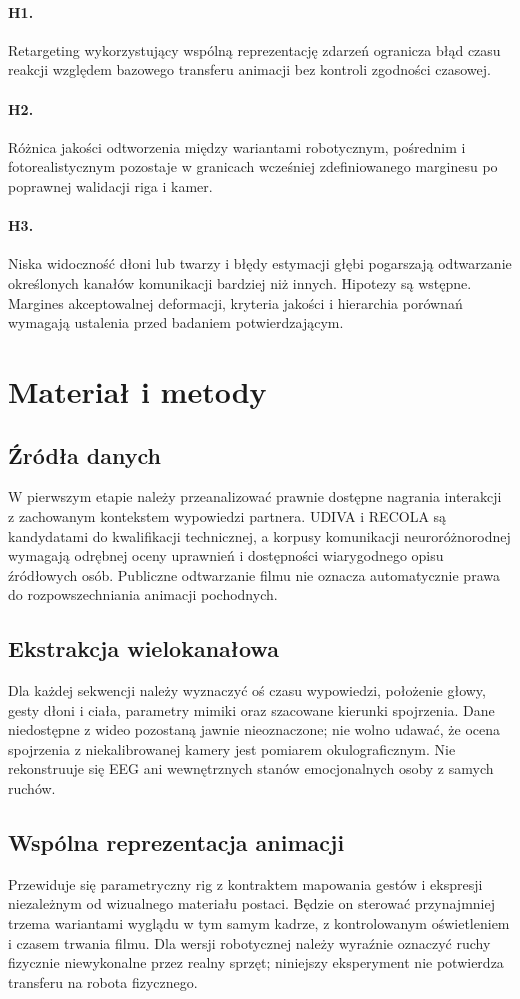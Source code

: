 \documentclass[11pt,a4paper]{article}
\begin{document}
\paragraph{H1.} Retargeting wykorzystujący wspólną reprezentację zdarzeń ogranicza błąd czasu reakcji względem bazowego transferu animacji bez kontroli zgodności czasowej.
\paragraph{H2.} Różnica jakości odtworzenia między wariantami robotycznym, pośrednim i fotorealistycznym pozostaje w granicach wcześniej zdefiniowanego marginesu po poprawnej walidacji riga i kamer.
\paragraph{H3.} Niska widoczność dłoni lub twarzy i błędy estymacji głębi pogarszają odtwarzanie określonych kanałów komunikacji bardziej niż innych.
Hipotezy są wstępne. Margines akceptowalnej deformacji, kryteria jakości i hierarchia porównań wymagają ustalenia przed badaniem potwierdzającym.
\section{Materiał i metody}
\subsection{Źródła danych}
W pierwszym etapie należy przeanalizować prawnie dostępne nagrania interakcji z zachowanym kontekstem wypowiedzi partnera. UDIVA i RECOLA są kandydatami do kwalifikacji technicznej, a korpusy komunikacji neuroróżnorodnej wymagają odrębnej oceny uprawnień i dostępności wiarygodnego opisu źródłowych osób. Publiczne odtwarzanie filmu nie oznacza automatycznie prawa do rozpowszechniania animacji pochodnych.
\subsection{Ekstrakcja wielokanałowa}
Dla każdej sekwencji należy wyznaczyć oś czasu wypowiedzi, położenie głowy, gesty dłoni i ciała, parametry mimiki oraz szacowane kierunki spojrzenia. Dane niedostępne z wideo pozostaną jawnie nieoznaczone; nie wolno udawać, że ocena spojrzenia z niekalibrowanej kamery jest pomiarem okulograficznym. Nie rekonstruuje się EEG ani wewnętrznych stanów emocjonalnych osoby z samych ruchów.
\subsection{Wspólna reprezentacja animacji}
Przewiduje się parametryczny rig z kontraktem mapowania gestów i ekspresji niezależnym od wizualnego materiału postaci. Będzie on sterować przynajmniej trzema wariantami wyglądu w tym samym kadrze, z kontrolowanym oświetleniem i czasem trwania filmu. Dla wersji robotycznej należy wyraźnie oznaczyć ruchy fizycznie niewykonalne przez realny sprzęt; niniejszy eksperyment nie potwierdza transferu na robota fizycznego.
\end{document}
